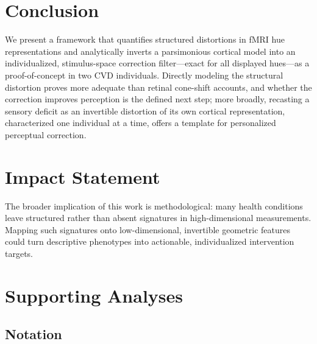 \documentclass{article}
\begin{document}
\section{Conclusion}
\label{sec:conclusion}

We present a framework that quantifies structured distortions in fMRI hue representations and analytically inverts a parsimonious cortical model into an individualized, stimulus-space correction filter---exact for all displayed hues---as a proof-of-concept in two CVD individuals.
Directly modeling the structural distortion proves more adequate than retinal cone-shift accounts, and whether the correction improves perception is the defined next step; more broadly, recasting a sensory deficit as an invertible distortion of its own cortical representation, characterized one individual at a time, offers a template for personalized perceptual correction.

\section*{Impact Statement}

The broader implication of this work is methodological: many health conditions leave structured rather than absent signatures in high-dimensional measurements.
Mapping such signatures onto low-dimensional, invertible geometric features could turn descriptive phenotypes into actionable, individualized intervention targets.




\newpage
\appendix
\onecolumn

\section{Supporting Analyses}
\label{app:supporting}

\subsection{Notation}
\label{app:notation}
\end{document}
